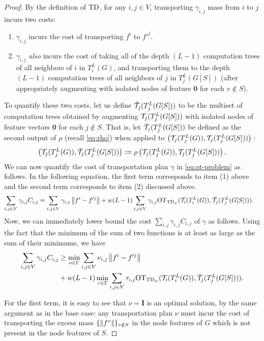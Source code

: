 \begin{proof}
By the definition of $\textnormal{TD}$, for any $i, j \in V$, transporting $\gamma_{i,j}$ mass from $i$ to $j$ incurs two costs:
\begin{enumerate}[label={(\arabic*)}]
    \item $\gamma_{i,j}$ incurs the cost of transporting $f^i$ to $f'^j$.
    \item $\gamma_{i,j}$ \emph{also} incurs the cost of taking all of the depth $(L-1)$ computation trees of all neighbors of $i$ in $T_i^L(G)$, and transporting them to the depth $(L-1)$ computation trees of all neighbors of $j$ in $T_j^L(G[S])$ (after appropriately augmenting with isolated nodes of feature $\bm{0}$ for each $v \notin S$).
\end{enumerate}
To quantify these two costs, let us define $\bar{\mathcal T}_j(T_j^L(G[S]))$ to be the multiset of computation trees obtained by augmenting $\mathcal T_j(T_j^L(G[S]))$ with isolated nodes of feature vectors $\bm{0}$ for each $j \notin S$. That is, let $\bar{\mathcal T}_j(T_j^L(G[S]))$ be defined as the second output of $\rho$ (recall \eqref{eq:rho}) when applied to $\left(\mathcal T_j(T_j^L(G)), \mathcal T_j(T_j^L(G[S])) \right ):$
\begin{align*}
\left(\mathcal T_j(T_j^L(G)), \bar{\mathcal T}_j(T_j^L(G[S])) \right ) \mathrel{\mathop:}= \rho\left(\mathcal T_j(T_j^L(G)), \mathcal T_j(T_j^L(G[S])) \right ).
\end{align*}
We can now quantify the cost of transportation plan $\gamma$ in \eqref{eq:ot-problem} as follows. In the following equation, the first term corresponds to item (1) above and the second term corresponds to item (2) discussed above. 
\begin{align*}
    \sum_{i,j \in V} \gamma_{i,j} C_{i,j} &= \sum_{i,j \in V} \gamma_{i,j} \left\lVert f^i - f'^j\right\rVert + w(L-1) \sum_{i,j \in V} \gamma_{i,j} \textnormal{OT}_{\textnormal{TD}_{w}}{(\mathcal T_i(T_i^L(G)), \bar{\mathcal T}_j(T_j^L({G}[S])))}. 
\end{align*}
Now, we can immediately lower bound the cost $\sum_{i,j} \gamma_{i,j} C_{i,j}$ of $\gamma$ as follows. Using the fact that the minimum of the sum of two functions is at least as large as the sum of their minimums, we have
\begin{align*}
    \sum_{i,j \in V} \gamma_{i,j} C_{i,j} &\geq \min_{\nu \in \Gamma}\sum_{i,j\in V} \nu_{i,j} \left\lVert f^i - f'^j\right\rVert \\
    &+ w(L-1) \min_{\tau \in \Gamma}\sum_{i,j\in V} \tau_{i,j} \textnormal{OT}_{\textnormal{TD}_{w}}{(\mathcal T_i(T_i^L(G)), \bar{\mathcal T}_j(T_j^L(G[S])))}.
\end{align*}

For the first term, it is easy to see that $\nu = \bm{I}$ is an optimal solution, by the same argument as in the base case: any transportation plan $\nu$ must incur the cost of transporting the excess mass $\{\left\lVert f^v\right\rVert\}_{v \notin S}$ in the node features of $G$ which is not present in the node features of $S.$


\end{proof}
